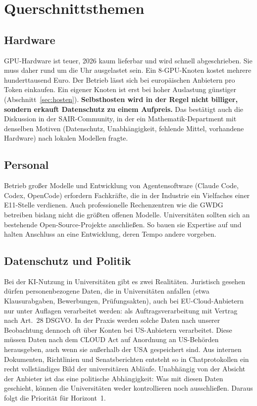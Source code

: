 \documentclass[a4paper,11pt]{article}
\begin{document}
\clearpage
\section{Querschnittsthemen}
\label{sec:querschnitt}

\subsection{Hardware}

GPU-Hardware ist teuer, 2026 kaum lieferbar und wird schnell
abgeschrieben. Sie muss daher rund um die Uhr ausgelastet sein. Ein
8-GPU-Knoten kostet mehrere hunderttausend Euro. Der Betrieb lässt
sich bei europäischen Anbietern pro Token einkaufen.  Ein eigener
Knoten ist erst bei hoher Auslastung günstiger
(Abschnitt~\ref{sec:hosten}).  \textbf{Selbsthosten wird in der Regel
  nicht billiger, sondern erkauft Datenschutz zu einem Aufpreis.} Das
bestätigt auch die Diskussion in der
SAIR-Community, in der ein Mathematik-Department mit denselben Motiven
(Datenschutz, Unabhängigkeit, fehlende Mittel, vorhandene Hardware)
nach lokalen Modellen fragte.

\subsection{Personal}
Betrieb großer Modelle und Entwicklung von Agentensoftware
(Claude Code, Codex, OpenCode) erfordern Fachkräfte, die in der
Industrie ein Vielfaches einer E11-Stelle verdienen. Auch
professionelle Rechenzentren wie die GWDG betreiben bislang nicht die
größten offenen Modelle.  Universitäten sollten sich an bestehende
Open-Source-Projekte anschließen.  So bauen sie Expertise auf und
halten Anschluss an eine Entwicklung, deren Tempo andere vorgeben.

\subsection{Datenschutz und Politik}
\label{sec:datenschutz}

Bei der KI-Nutzung in Universitäten gibt es zwei Realitäten.
Juristisch gesehen dürfen personenbezogene Daten, die in
Universitäten anfallen (etwa Klausurabgaben, Bewerbungen,
Prüfungsakten), auch bei EU-Cloud-Anbietern nur unter Auflagen
verarbeitet werden: als Auftragsverarbeitung mit Vertrag nach Art.~28
DSGVO.
In der Praxis werden solche Daten nach unserer Beobachtung dennoch
oft über Konten bei US-Anbietern verarbeitet.  Diese müssen Daten
nach dem CLOUD Act auf Anordnung an US-Behörden herausgeben, auch
wenn sie außerhalb der USA gespeichert sind.  Aus internen
Dokumenten, Richtlinien und Senatsberichten entsteht so in
Chatprotokollen ein recht vollständiges Bild der universitären
Abläufe.  Unabhängig von der Absicht der Anbieter ist das eine
politische Abhängigkeit: Was mit diesen Daten geschieht, können die
Universitäten weder kontrollieren noch ausschließen.
Daraus folgt die Priorität für Horizont~1.
\end{document}
